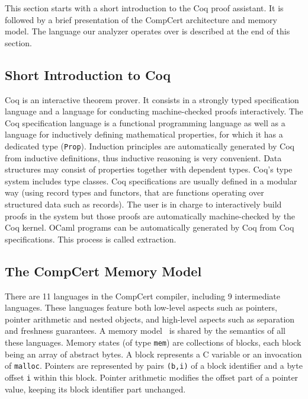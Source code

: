 This section starts with a short introduction to the Coq proof
assistant. It is followed by a brief presentation of the CompCert
architecture and memory model. The language our analyzer operates over
is described at the end of this section.

\subsection{Short Introduction to Coq}
Coq is an interactive theorem prover. It consists in a strongly typed
specification language and a language for conducting machine-checked
proofs interactively.  The Coq specification language is a functional
programming language as well as a language for inductively defining
mathematical properties, for which it has a dedicated type
(\lstinline!Prop!).  Induction principles are automatically generated
by Coq from inductive definitions, thus inductive reasoning is very
convenient.  Data structures may consist of properties together with
dependent types. Coq's type system includes type classes.  Coq
specifications are usually defined in a modular way (\eg using record
types and functors, that are functions operating over structured data
such as records). 
The user is in charge to interactively
build proofs in the system but those proofs are automatically
machine-checked by the Coq kernel. OCaml programs can be automatically
generated by Coq from Coq specifications. This process is called extraction.

\subsection{The CompCert Memory Model}\label{sec:compc-memory-model}

There are 11 languages in the CompCert compiler, including 9
intermediate languages. These languages feature both low-level aspects
such as pointers, pointer arithmetic and nested objects, and
high-level aspects such as separation and freshness guarantees.
A memory model~\cite{Leroy-Appel-Blazy-Stewart-memory-v2} is shared by the semantics of all these languages.
Memory states (of type \lstinline!mem!) are collections of blocks, each block being an array
of abstract bytes. A block represents a C variable or an invocation of \lstinline!malloc!.
Pointers are represented by pairs \lstinline!(b,i)! of a block identifier and
a byte offset  \lstinline!i! within this block.
Pointer arithmetic modifies the offset part of a pointer value,
keeping its block identifier part unchanged.




